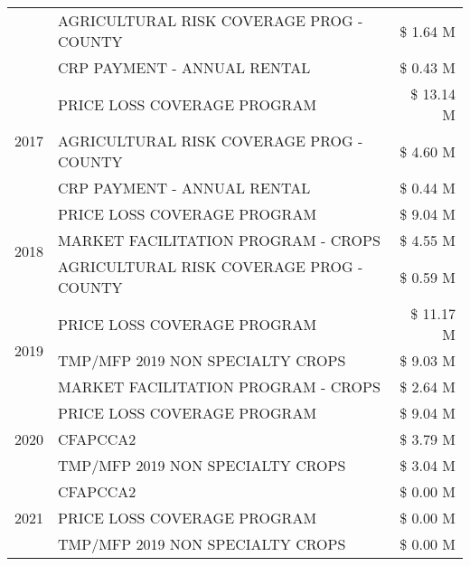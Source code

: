 \begin{tabular}{llr}
 & AGRICULTURAL RISK COVERAGE PROG - COUNTY      & \$ 1.64 M \\
 & CRP PAYMENT - ANNUAL RENTAL                   & \$ 0.43 M \\
\cline{1-3}
\multirow[t]{3}{*}{2017} & PRICE LOSS COVERAGE PROGRAM & \$ 13.14 M \\
 & AGRICULTURAL RISK COVERAGE PROG - COUNTY & \$ 4.60 M \\
 & CRP PAYMENT - ANNUAL RENTAL & \$ 0.44 M \\
\cline{1-3}
\multirow[t]{3}{*}{2018} & PRICE LOSS COVERAGE PROGRAM & \$ 9.04 M \\
 & MARKET FACILITATION PROGRAM - CROPS & \$ 4.55 M \\
 & AGRICULTURAL RISK COVERAGE PROG - COUNTY & \$ 0.59 M \\
\cline{1-3}
\multirow[t]{3}{*}{2019} & PRICE LOSS COVERAGE PROGRAM & \$ 11.17 M \\
 & TMP/MFP 2019 NON SPECIALTY CROPS & \$ 9.03 M \\
 & MARKET FACILITATION PROGRAM - CROPS & \$ 2.64 M \\
\cline{1-3}
\multirow[t]{3}{*}{2020} & PRICE LOSS COVERAGE PROGRAM & \$ 9.04 M \\
 & CFAPCCA2 & \$ 3.79 M \\
 & TMP/MFP 2019 NON SPECIALTY CROPS & \$ 3.04 M \\
\cline{1-3}
\multirow[t]{3}{*}{2021} & CFAPCCA2 & \$ 0.00 M \\
 & PRICE LOSS COVERAGE PROGRAM & \$ 0.00 M \\
 & TMP/MFP 2019 NON SPECIALTY CROPS & \$ 0.00 M \\
\cline{1-3}
\bottomrule
\end{tabular}
